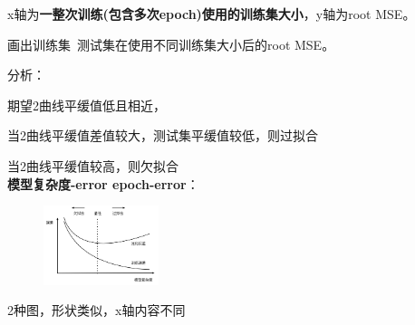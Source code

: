 \documentclass[UTF8]{ctexart}
\begin{document}
  x轴为\textbf{一整次训练(包含多次epoch)使用的训练集大小}，y轴为root MSE。

  画出训练集\ 测试集在使用不同训练集大小后的root MSE。

  分析：

  \quad 期望2曲线平缓值低且相近，

  \quad 当2曲线平缓值差值较大，测试集平缓值较低，则过拟合

  \quad 当2曲线平缓值较高，则欠拟合\\
\textbf{模型复杂度-error epoch-error}：

  \begin{figure}[H] %
    \centering %
    \includegraphics[width=0.3\textwidth]{note_images/epoch-complex-error.png} %
  \end{figure}

  2种图，形状类似，x轴内容不同\\
\end{document}

